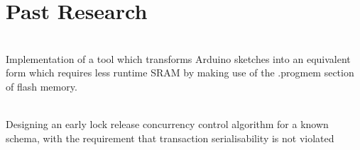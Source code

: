 \documentclass[]{deedy-resume-openfont}
\begin{document}
\begin{minipage}[t]{0.66\textwidth}


\section{Past Research}
\\
Implementation of a tool which transforms Arduino sketches into an equivalent form which requires less runtime SRAM by making use of the .progmem section of flash memory.
\sectionsep

\\
Designing an early lock release concurrency control algorithm for a known schema, with the requirement that transaction serialisability is not violated

\sectionsep



%
%

\end{minipage}
\end{document}
